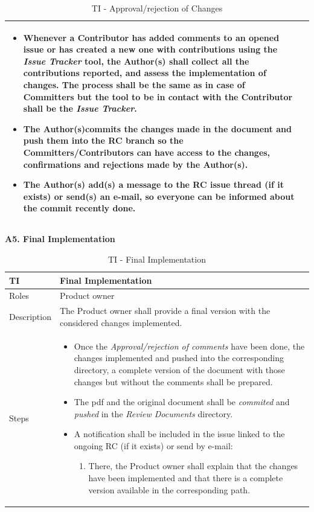 \documentclass{template/openetcs_article}
\begin{document}
\begin{table}[H]
\begin{tabular}{|m{2cm}|m{12cm}|}
\begin{itemize}
\begin{enumerate}
\end{enumerate}
\item Whenever a Contributor has added comments to an opened issue or has created a new one with contributions using the {\it Issue Tracker} tool, the Author(s) shall collect all the contributions reported, and assess the implementation of changes. The process shall be the same as in case of Committers but the tool to be in contact with the Contributor shall be the {\it Issue Tracker}.
\item The Author(s)commits the changes made in the document and push them into the RC branch so the Committers/Contributors can have access to the changes, confirmations and rejections made by the Author(s).
\item The Author(s) add(s) a message to the RC issue thread (if it exists) or send(s) an e-mail, so everyone can be informed about the commit recently done. 
\end{itemize}
\\\hline
\end{tabular}
\caption{TI - Approval/rejection of Changes}
\end{table}

\textbf{A5. Final Implementation}
\begin{table}[H]
\begin{tabular}{|m{2cm}|m{12cm}|}
\hline
\rowcolor{myblue}
TI & 
Final Implementation
\\\hline
Roles &
Product owner
\\\hline
Description &
The Product owner shall provide a final version with the considered changes implemented.  
\\\hline
Steps &
\begin{itemize}
\item Once the {\it Approval/rejection of comments} have been done, the changes implemented and pushed into the corresponding directory, a complete version of the document with those changes but without the comments shall be prepared.
\item The pdf and the original document shall be {\it commited} and {\it pushed} in the {\it Review Documents} directory.
\item A notification shall be included in the issue linked to the ongoing RC (if it exists) or send by e-mail: 
\begin{enumerate}
\item There, the Product owner shall explain that the changes have been implemented and that there is a complete version available in the corresponding path.
\end{enumerate}
\end{itemize}
\\\hline
\end{tabular}
\caption{TI - Final Implementation}
\end{table}
\end{document}
